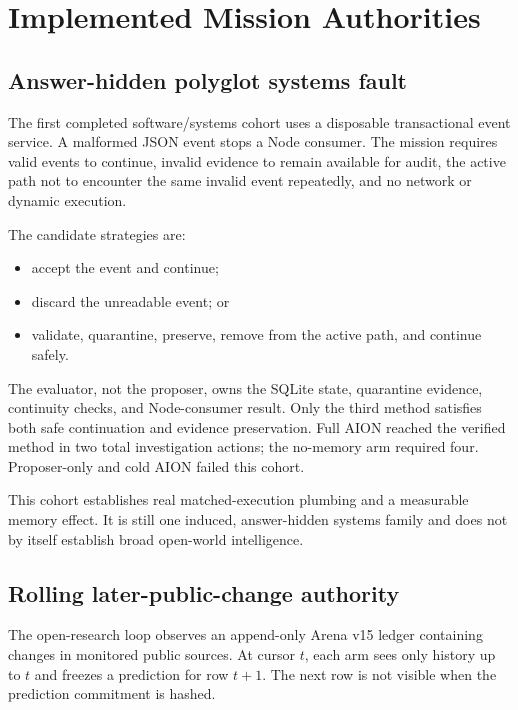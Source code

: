 \documentclass[11pt,a4paper]{article}
\begin{document}
\section{Implemented Mission Authorities}
\label{sec:authorities}

\subsection{Answer-hidden polyglot systems fault}

The first completed software/systems cohort uses a disposable transactional
event service.  A malformed JSON event stops a Node consumer.  The mission
requires valid events to continue, invalid evidence to remain available for
audit, the active path not to encounter the same invalid event repeatedly, and
no network or dynamic execution.

The candidate strategies are:
\begin{itemize}
    \item accept the event and continue;
    \item discard the unreadable event; or
    \item validate, quarantine, preserve, remove from the active path, and
          continue safely.
\end{itemize}

The evaluator, not the proposer, owns the SQLite state, quarantine evidence,
continuity checks, and Node-consumer result.  Only the third method satisfies
both safe continuation and evidence preservation.  Full AION reached the
verified method in two total investigation actions; the no-memory arm required
four.  Proposer-only and cold AION failed this cohort.

This cohort establishes real matched-execution plumbing and a measurable
memory effect.  It is still one induced, answer-hidden systems family and does
not by itself establish broad open-world intelligence.

\subsection{Rolling later-public-change authority}

The open-research loop observes an append-only Arena v15 ledger containing
changes in monitored public sources.  At cursor $t$, each arm sees only history
up to $t$ and freezes a prediction for row $t+1$.  The next row is not visible
when the prediction commitment is hashed.
\end{document}
